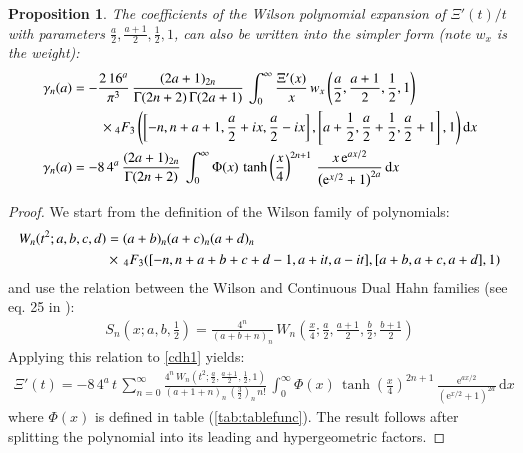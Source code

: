 \documentclass[a4paper,11pt,twoside]{amsart}
\newtheorem{proposition}[theorem]{Proposition}
\newcommand{\verifiedeq}{=}
\newcommand{\defeq}{=}
\newcommand{\verifiedeq}{\stackrel{\checkmark}{=}}
\newcommand{\defeq}{\stackrel{\scriptscriptstyle \textnormal{def}}{=}}
\begin{document}
\begin{proposition}
The coefficients of the Wilson polynomial expansion of $\Xi'(t)/t$ with parameters $\frac{a}{2},\frac{a+1}{2},\frac12,1$, can also be written into the simpler form (note $w_x$ is the weight):   
\begin{align}
 \gamma_n(a) &\verifiedeq-\frac{2\,16^a}{\pi^3}\,\frac{(2a+1)_{2n}}{\Gamma(2n+2)\,\Gamma(2a+1)}\,\int_{0}^\infty \frac{\Xi'(x)}{x}\,w_x\left(\frac{a}{2},\frac{a+1}{2},\frac12,1\right) \,\\ &\qquad \times {}_4F_3\left(\left[-n,n+a+1,\frac{a}{2}+ix, \frac{a}{2}-ix\right],\left[a+\frac12,\frac{a}{2}+\frac12,\frac{a}{2}+1\right],1\right) \mathrm{d}x \notag \\
 \gamma_n(a) &\verifiedeq -8\,4^a\,\frac{(2a+1)_{2n}}{\Gamma(2n+2)}\,\int_{0}^\infty \Phi(x)\,\tanh\left(\frac{x}{4}\right)^{2n+1}\,\frac{x\,\mathrm{e}^{ax/2}}{\left(\mathrm{e}^{x/2}+1\right)^{2a}} \, \mathrm{d}x
\end{align}
\end{proposition}
\begin{proof}
We start from the definition of the Wilson family of polynomials:
\begin{align}
 W_n(t^2;a,b,c,d) &\defeq (a+b)_n(a+c)_n(a+d)_n\, \\
  &\times\, {}_4F_3([-n, n+ a+b+c+d-1,a+it, a- it], [a+b, a+c, a+d], 1) \notag
\end{align}
and use the relation between the Wilson and Continuous Dual Hahn families (see eq. 25 in \cite{koesup}):
\begin{align}
 S_n\left(x;a,b,\frac12\right) \verifiedeq \frac{4^n}{(a+b+n)_n}\, W_n\left(\frac{x}{4};\frac{a}{2},\frac{a+1}{2},\frac{b}{2},\frac{b+1}{2}\right)
\end{align}
Applying this relation to \ref{cdh1} yields:
\begin{align}
  \Xi'(t)\verifiedeq -8\,4^a\,t\,\sum_{n=0}^\infty \frac{4^n\,W_n\left(t^2;\frac{a}{2},\frac{a+1}{2},\frac12,1\right)}{(a+1+n)_n\,\left(\frac32\right)_n\,n!}\,\int_{0}^{\infty} \Phi(x)\,\tanh\left(\frac{x}{4}\right)^{2n+1}\,\frac{\mathrm{e}^{ax/2}}{(\mathrm{e}^{x/2}+1)^{2a}}\,\mathrm{d}x
\end{align}
where $\Phi(x)$ is defined in table (\ref{tab:tablefunc}). The result follows after splitting the polynomial into its leading and hypergeometric factors.
\end{proof}
\end{document}
